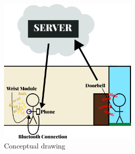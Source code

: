\begin{figure}[h!]
	\centering
   	\includegraphics[width=0.60\textwidth]{images/high-level-system-overview.png}
    \caption{Conceptual drawing}
\end{figure}
